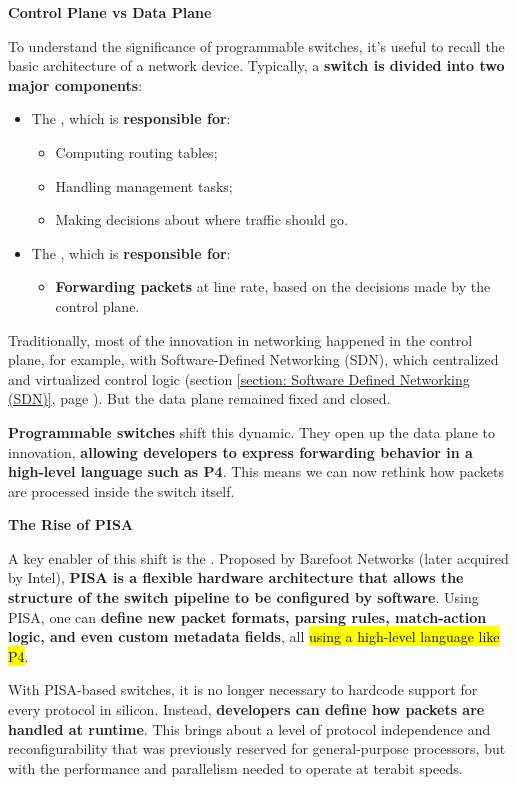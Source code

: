 \highspace
\begin{flushleft}
    \textcolor{Green3}{ \textbf{Control Plane vs Data Plane}}
\end{flushleft}
To understand the significance of programmable switches, it's useful to recall the basic architecture of a network device. Typically, a \textbf{switch is divided into two major components}:
\begin{itemize}
    \item The , which is \textbf{responsible for}:
    \begin{itemize}
        \item Computing routing tables;
        \item Handling management tasks;
        \item Making decisions about where traffic should go.
    \end{itemize}
    \item The , which is \textbf{responsible for}:
    \begin{itemize}
        \item \textbf{Forwarding packets} at line rate, based on the decisions made by the control plane.
    \end{itemize}
\end{itemize}
Traditionally, most of the innovation in networking happened in the control plane, for example, with Software-Defined Networking (SDN), which centralized and virtualized control logic (section \ref{section: Software Defined Networking (SDN)}, page \pageref{section: Software Defined Networking (SDN)}). But the data plane remained fixed and closed.

\highspace
\textbf{Programmable switches} shift this dynamic. They open up the data plane to innovation, \textbf{allowing developers to express forwarding behavior in a high-level language such as P4}. This means we can now rethink how packets are processed inside the switch itself.

\highspace
\begin{flushleft}
    \textcolor{Green3}{ \textbf{The Rise of PISA}}
\end{flushleft}
A key enabler of this shift is the . Proposed by Barefoot Networks (later acquired by Intel), \textbf{PISA is a flexible hardware architecture that allows the structure of the switch pipeline to be configured by software}. Using PISA, one can \textbf{define new packet formats, parsing rules, match-action logic, and even custom metadata fields}, all \hl{using a high-level language like P4}.

\highspace
With PISA-based switches, it is no longer necessary to hardcode support for every protocol in silicon. Instead, \textbf{developers can define how packets are handled at runtime}. This brings about a level of protocol independence and reconfigurability that was previously reserved for general-purpose processors, but with the performance and parallelism needed to operate at terabit speeds.